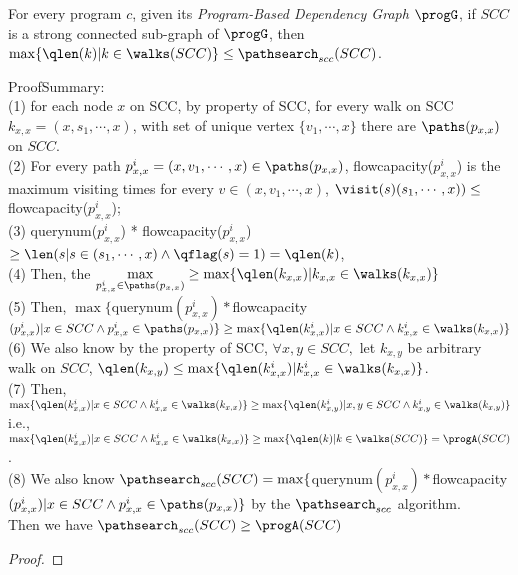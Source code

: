 \begin{lem}
  \label{lem:sound_adaptalg_scc}
  For every program $c$, given its \emph{Program-Based Dependency Graph} $\progG$, if $SCC$ is a strong connected sub-graph of $\progG$, then
  $\max\{\qlen(k) | k \in \walks(SCC)\} \leq \pathsearch_{scc}(SCC) $.
\end{lem}

ProofSummary:
\\
(1) for each node $x$ on SCC, by property of SCC, 
for every walk on SCC $k_{x, x} = (x, s_1, \cdots, x)$,
with set of unique vertex $\{v_1, \cdots, x\}$
there are $\paths(p_{x,x})$ on $SCC$.
\\
(2) For every path $p_{x,x}^{i} = (x, v_1, \cdots, x) \in \paths(p_{x,x})$,  
flowcapacity($p_{x,x}^{i}$) is the maximum visiting times for every $v \in (x, v_1, \cdots, x)$, 
$\visit(s) (s_1, \cdots, x)) \leq $ flowcapacity($p_{x,x}^{i}$);
\\
(3) querynum($p_{x,x}^{i}$)  * flowcapacity($p_{x,x}^{i}$)  $\geq\len(s | s \in ( s_1, \cdots, x) \land \qflag(s) = 1) =  \qlen(k)$,
\\
(4) Then, the $\max\limits_{p_{x,x}^{i} \in \paths(p_{x,x})} \geq \max\{\qlen(k_{x, x}) | k_{x, x} \in \walks(k_{x, x})\}$
\\
(5) Then,  $\max\{$querynum$(p_{x,x}^{i})  * $flowcapacity$(p_{x,x}^{i}) | x \in SCC \land {p_{x,x}^{i} \in \paths(p_{x,x})} \} 
\geq \max\{\qlen(k_{x, x}^i) |x \in SCC \land  k_{x, x}^i \in \walks(k_{x, x})\}$
\\
(6) We also know by the property of SCC, $\forall x, y \in SCC, $ let $k_{x, y}$ be arbitrary walk on $SCC$,
 $\qlen(k_{x, y}) \leq \max\{\qlen(k_{x, x}^i) | k_{x, x}^i \in \walks(k_{x, x})\}$.
\\
(7) Then,$ \max\{\qlen(k_{x, x}^i) |x \in SCC \land  k_{x, x}^i \in \walks(k_{x, x})\} \geq  \max\{\qlen(k_{x, y}^i) |x, y \in SCC \land  k_{x, y}^i \in \walks(k_{x, y})\}$
\\
i.e., 
$ \max\{\qlen(k_{x, x}^i) |x \in SCC \land  k_{x, x}^i \in \walks(k_{x, x})\} \geq  \max\{\qlen(k) | k\in \walks(SCC)\} = \progA(SCC)$.
\\
(8) We also know 
$\pathsearch_{scc}(SCC) = \max\{$querynum$(p_{x,x}^{i})  * $flowcapacity$(p_{x,x}^{i}) | x \in SCC \land {p_{x,x}^{i} \in \paths(p_{x,x})} \} $ by the $\pathsearch_{scc}$ algorithm.
\\
Then we have
$\pathsearch_{scc}(SCC) \geq \progA(SCC)$
\\
\begin{proof}
\end{proof}